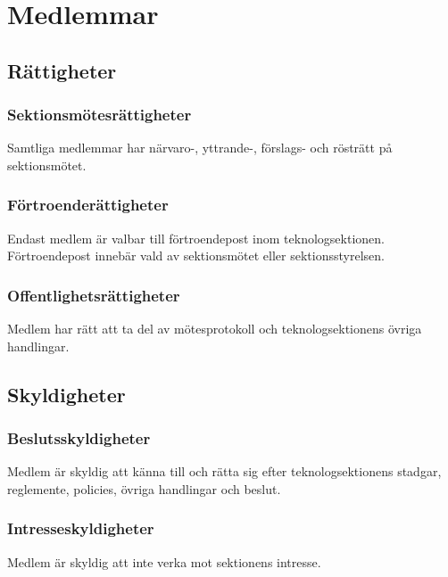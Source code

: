 \section{Medlemmar}

\subsection{Rättigheter}

\subsubsection{Sektionsmötesrättigheter}
Samtliga medlemmar har närvaro-, yttrande-, förslags- och rösträtt på sektionsmötet.

\subsubsection{Förtroenderättigheter}
Endast medlem är valbar till förtroendepost inom teknologsektionen. Förtroendepost innebär vald av sektionsmötet eller sektionsstyrelsen.

\subsubsection{Offentlighetsrättigheter}
Medlem har rätt att ta del av mötesprotokoll och teknologsektionens övriga handlingar.

\subsection{Skyldigheter}

\subsubsection{Beslutsskyldigheter}
Medlem är skyldig att känna till och rätta sig efter teknologsektionens stadgar, reglemente, policies, övriga handlingar och beslut.

\subsubsection{Intresseskyldigheter}
Medlem är skyldig att inte verka mot sektionens intresse.

